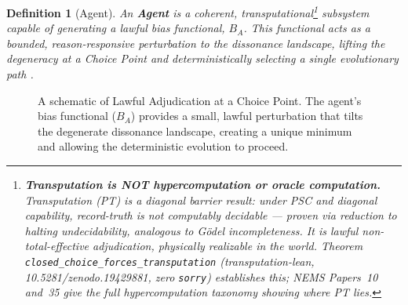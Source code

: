 \documentclass[12pt]{article}
\newtheorem{definition}[theorem]{Definition}
\begin{document}
\begin{definition}[Agent]
\label{def:agent}
An \textbf{Agent} is a coherent, transputational\footnote{\textbf{Transputation is NOT hypercomputation or oracle computation.} Transputation (PT) is a \emph{diagonal barrier} result: under PSC and diagonal capability, record-truth is not computably decidable --- proven via reduction to halting undecidability, analogous to Gödel incompleteness. It is lawful non-total-effective adjudication, physically realizable in the world. Theorem \texttt{closed\_choice\_forces\_transputation} (transputation-lean, 10.5281/zenodo.19429881, zero \texttt{sorry}) establishes this; NEMS Papers~10 and~35 give the full hypercomputation taxonomy showing where PT lies.} subsystem capable of generating a lawful bias functional, $B_A$. This functional acts as a bounded, reason-responsive perturbation to the dissonance landscape, lifting the degeneracy at a Choice Point and deterministically selecting a single evolutionary path \cite{SpivackUGPSurvey}.
\end{definition}

\begin{figure}[t]
\centering
{}
\caption{A schematic of Lawful Adjudication at a Choice Point. The agent's bias functional ($B_A$) provides a small, lawful perturbation that tilts the degenerate dissonance landscape, creating a unique minimum and allowing the deterministic evolution to proceed.}
\label{fig:choice_point}
\end{figure}
\end{document}
